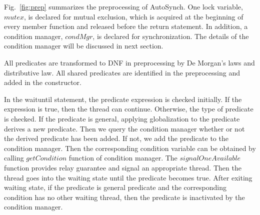 \documentclass[preprint]{sigplanconf}
\begin{document}
Fig.~\ref{fig:prep} summarizes the preprocessing of AutoSynch. One lock 
variable, $mutex$, is declared for mutual exclusion, which is acquired at the 
beginning of every member function and released before the return statement.
In addition, a condition manager, $condMgr$, is declared for 
synchronization. The details of the condition manager will be discussed in next
section.  

All predicates are transformed to DNF in
preprocessing by De Morgan's laws and distributive law. All shared
predicates are identified in the preprocessing and added in the constructor. 


In the waituntil statement, the predicate expression is checked initially. If 
the expression is true, then the thread can continue. Otherwise, the type of
predicate is checked. If the predicate is general, applying globalization to 
the predicate derives a new predicate. Then we query the condition manager 
whether or not the derived predicate has been added. If not, we add the 
predicate to the condition manager. Then the corresponding condition variable
can be obtained by calling $getCondition$ function of condition manager. The
$signalOneAvailable$ function provides relay guarantee and signal an
appropriate thread. Then the thread goes into the waiting state until the
predicate becomes true. After exiting waiting state, if the predicate is
general predicate and the corresponding condition has no other waiting thread,
then the predicate is inactivated by the condition manager.

%
%
\end{document}

